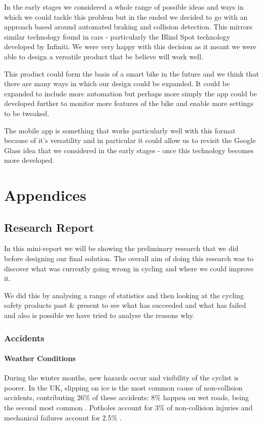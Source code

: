 \documentclass[a4paper]{report}
\begin{document}
{In the early stages we considered a whole range of possible ideas and ways in which we could tackle this problem but in the ended we decided to go with an approach based around automated braking and collision detection. This mirrors similar technology found in cars - particularly the Blind Spot technology developed by Infiniti. We were very happy with this decision as it meant we were able to design a versatile product that be believe will work well.

This product could form the basis of a smart bike in the future and we think that there are many ways in which our design could be expanded. It could be expanded to include more automation but perhaps more simply the app could be developed further to monitor more features of the bike and enable more settings to be tweaked. 

The mobile app is something that works particularly well with this format because of it's versatility and in particular it could allow us to revisit the Google Glass idea that we considered in the early stages - once this technology becomes more developed.

\part*{Appendices}

\appendix
\chapter{Research Report}
In this mini-report we will be showing the preliminary research that we did before designing our final solution. The overall aim of doing this research was to discover what was currently going wrong in cycling and where we could improve it. 

We did this by analysing a range of statistics and then looking at the cycling safety products past \& present to see what has succeeded and what has failed and also is possible we have tried to analyse the reasons why. 
\newpage
\section{Accidents}
\subsection{Weather Conditions}
During the winter months, new hazards occur and visibility of the cyclist is poorer. In the UK, slipping on ice is the most common cause of non-collision accidents, contributing 26\% of these accidents; 8\% happen on wet roads, being the second most common \citep{winter_safety}. Potholes account for 3\% of non-collision injuries and mechanical failures account for 2.5\% \citep{non-collision_casestudy}.

}
\end{document}

